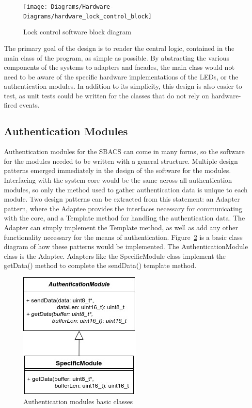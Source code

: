 \documentclass[12pt]{report}
\let\Oldsubsection\subsection
\renewcommand{\subsection}{\FloatBarrier\Oldsubsection}
\begin{document}
\begin{figure}
    \texttt{[image: Diagrams/Hardware-Diagrams/hardware\_lock\_control\_block]}
    \caption{Lock control software block diagram}
    \label{fig:hardware-lock-control-block}
\end{figure}

The primary goal of the design is to render the central logic, contained in the main class of the program, as simple as 
possible. By abstracting the various components of the systems to adapters and facades, the main class would not need 
to be aware of the specific hardware implementations of the LEDs, or the authentication modules. In addition to its 
simplicity, this design is also easier to test, as unit tests could be written for the classes that do not rely on 
hardware-fired events.


\subsection{Authentication Modules} \label{authentication-modules}

Authentication modules for the SBACS can come in many forms, so the software for the modules needed to be written with 
a general structure. Multiple design patterns emerged immediately in the design of the software for the modules. 
Interfacing with the system core would be the same across all authentication modules, so only the method used to gather 
authentication data is unique to each module. Two design patterns can be extracted from this statement: an Adapter 
pattern, where the Adaptee provides the interfaces necessary for communicating with the core, and a Template method for 
handling the authentication data. The Adapter can simply implement the Template method, as well as add any other 
functionality necessary for the means of authentication. Figure~\ref{fig:modules-start} is a basic class diagram of how 
these patterns would be implemented. The AuthenticationModule class is the Adaptee. Adapters like the SpecificModule 
class implement the getData() method to complete the sendData() template method.

\begin{figure}
    \centering
    \includegraphics{Diagrams/Hardware-Diagrams/modules_start}
    \caption{Authentication modules basic classes}
    \label{fig:modules-start}
\end{figure}
\end{document}
